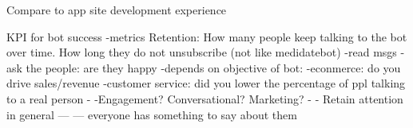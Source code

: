 




Compare to app site development experience 

KPI for bot success
-metrics
Retention: How many people keep talking to the bot over time. How long they do not unsubscribe (not like medidatebot)
-read msgs
-ask the people: are they happy
-depends on objective of bot:
-econmerce: do you drive sales/revenue
-customer service: did you lower the percentage of ppl talking to a real person
- -Engagement? Conversational? Marketing?
- - Retain attention in general
—
—
everyone has something to say about them